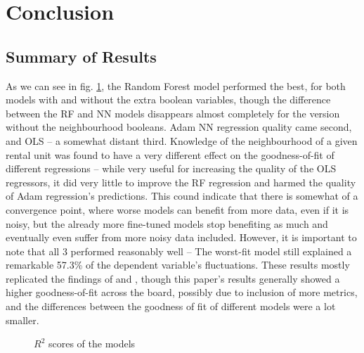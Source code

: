 \documentclass[12pt]{report}
\begin{document}
\section{Conclusion}
\subsection{Summary of Results}

As we can see in fig. \ref{fig:summary}, the Random Forest model performed the best, for both models with and without the extra boolean variables, though the difference between the RF and NN models disappears almost completely for the version without the neighbourhood booleans. Adam NN regression quality came second, and OLS -- a somewhat distant third. Knowledge of the neighbourhood of a given rental unit was found to have a very different effect on the goodness-of-fit of different regressions -- while very useful for increasing the quality of the OLS regressors, it did very little to improve the RF regression and harmed the quality of Adam regression's predictions. This cound indicate that there is somewhat of a convergence point, where worse models can benefit from more data, even if it is noisy, but the already more fine-tuned models stop benefiting as much and eventually even suffer from more noisy data included. However, it is important to note that all 3 performed reasonably well -- The worst-fit model still explained a remarkable 57.3\% of the dependent variable's fluctuations. These results mostly replicated the findings of \textcite{yoshida2022} and \textcite{neloy2019}, though this paper's results generally showed a higher goodness-of-fit across the board, possibly due to inclusion of more metrics, and the differences between the goodness of fit of different models were a lot smaller.

\begin{figure}[h]
	\centering
	\caption{$R^2$ scores of the models}
	\label{fig:summary}
\end{figure}
\end{document}
